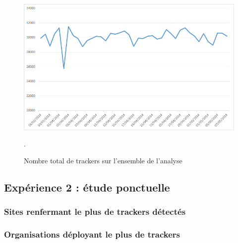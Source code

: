\begin{figure}[h]
	\centering
	\includegraphics[scale=.8]{graphiques/Exp1_parser_total_trackers.png}
	\caption{\label{Exp1_parser_total_trackers}Nombre total de trackers sur l'ensemble de l'analyse}.
\end{figure}
\subsection{Expérience 2 : étude ponctuelle}

\subsubsection{Sites renfermant le plus de trackers détectés}

\subsubsection{Organisations déployant le plus de trackers}
